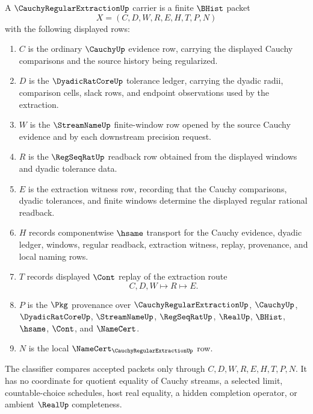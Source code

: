 \begin{definition}
\label{def:cauchy-regular-extraction-carrier}
A $\CauchyRegularExtractionUp$ carrier is a finite $\BHist$ packet
$$
X=(C,D,W,R,E,H,T,P,N)
$$
with the following displayed rows:
\begin{enumerate}
\item $C$ is the ordinary $\CauchyUp$ evidence row, carrying the displayed Cauchy comparisons and the source history being regularized.
\item $D$ is the $\DyadicRatCoreUp$ tolerance ledger, carrying the dyadic radii, comparison cells, slack rows, and endpoint observations used by the extraction.
\item $W$ is the $\StreamNameUp$ finite-window row opened by the source Cauchy evidence and by each downstream precision request.
\item $R$ is the $\RegSeqRatUp$ readback row obtained from the displayed windows and dyadic tolerance data.
\item $E$ is the extraction witness row, recording that the Cauchy comparisons, dyadic tolerances, and finite windows determine the displayed regular rational readback.
\item $H$ records componentwise $\hsame$ transport for the Cauchy evidence, dyadic ledger, windows, regular readback, extraction witness, replay, provenance, and local naming rows.
\item $T$ records displayed $\Cont$ replay of the extraction route
$$
C,D,W \longmapsto R \longmapsto E .
$$
\item $P$ is the $\Pkg$ provenance over $\CauchyRegularExtractionUp$, $\CauchyUp$, $\DyadicRatCoreUp$, $\StreamNameUp$, $\RegSeqRatUp$, $\RealUp$, $\BHist$, $\hsame$, $\Cont$, and $\NameCert$.
\item $N$ is the local $\NameCert_{\CauchyRegularExtractionUp}$ row.
\end{enumerate}
The classifier compares accepted packets only through $C,D,W,R,E,H,T,P,N$. It has no coordinate for quotient equality of Cauchy streams, a selected limit, countable-choice schedules, host real equality, a hidden completion operator, or ambient $\RealUp$ completeness.
\end{definition}

